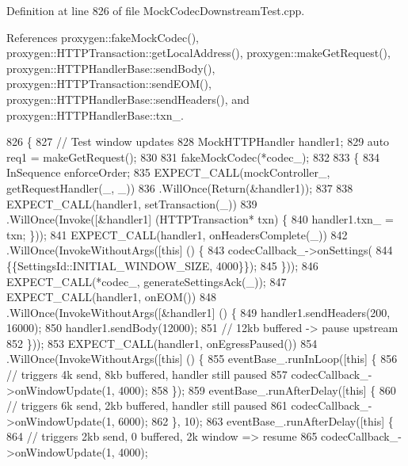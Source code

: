 Definition at line 826 of file Mock\+Codec\+Downstream\+Test.\+cpp.



References proxygen\+::fake\+Mock\+Codec(), proxygen\+::\+H\+T\+T\+P\+Transaction\+::get\+Local\+Address(), proxygen\+::make\+Get\+Request(), proxygen\+::\+H\+T\+T\+P\+Handler\+Base\+::send\+Body(), proxygen\+::\+H\+T\+T\+P\+Transaction\+::send\+E\+O\+M(), proxygen\+::\+H\+T\+T\+P\+Handler\+Base\+::send\+Headers(), and proxygen\+::\+H\+T\+T\+P\+Handler\+Base\+::txn\+\_\+.


\begin{DoxyCode}
826                                             \{
827   \textcolor{comment}{// Test window updates}
828   MockHTTPHandler handler1;
829   \textcolor{keyword}{auto} req1 = makeGetRequest();
830 
831   fakeMockCodec(*codec\_);
832 
833   \{
834     InSequence enforceOrder;
835     EXPECT\_CALL(mockController\_, getRequestHandler(\_, \_))
836       .WillOnce(Return(&handler1));
837 
838     EXPECT\_CALL(handler1, setTransaction(\_))
839       .WillOnce(Invoke([&handler1] (HTTPTransaction* txn) \{
840             handler1.txn_ = txn; \}));
841     EXPECT\_CALL(handler1, onHeadersComplete(\_))
842       .WillOnce(InvokeWithoutArgs([\textcolor{keyword}{this}] () \{
843             codecCallback\_->onSettings(
844               \{\{SettingsId::INITIAL\_WINDOW\_SIZE, 4000\}\});
845           \}));
846     EXPECT\_CALL(*codec\_, generateSettingsAck(\_));
847     EXPECT\_CALL(handler1, onEOM())
848       .WillOnce(InvokeWithoutArgs([&handler1] () \{
849             handler1.sendHeaders(200, 16000);
850             handler1.sendBody(12000);
851             \textcolor{comment}{// 12kb buffered -> pause upstream}
852           \}));
853     EXPECT\_CALL(handler1, onEgressPaused())
854       .WillOnce(InvokeWithoutArgs([\textcolor{keyword}{this}] () \{
855             eventBase\_.runInLoop([\textcolor{keyword}{this}] \{
856                 \textcolor{comment}{// triggers 4k send, 8kb buffered, handler still paused}
857                 codecCallback\_->onWindowUpdate(1, 4000);
858               \});
859             eventBase\_.runAfterDelay([\textcolor{keyword}{this}] \{
860                 \textcolor{comment}{// triggers 6k send, 2kb buffered, handler still paused}
861                 codecCallback\_->onWindowUpdate(1, 6000);
862               \}, 10);
863             eventBase\_.runAfterDelay([\textcolor{keyword}{this}] \{
864                 \textcolor{comment}{// triggers 2kb send, 0 buffered, 2k window => resume}
865                 codecCallback\_->onWindowUpdate(1, 4000);

\end{DoxyCode}
